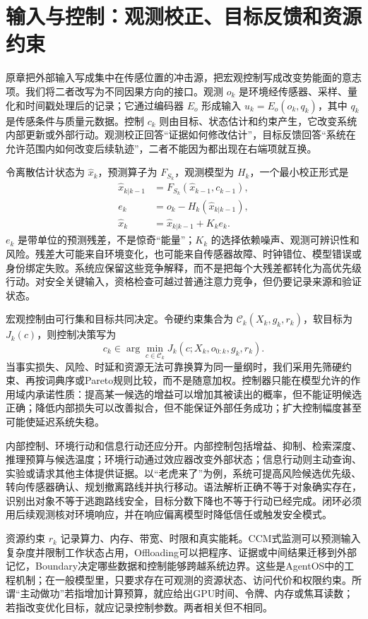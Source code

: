 \section{输入与控制：观测校正、目标反馈和资源约束}
\label{sec:section_9016}

原章把外部输入写成集中在传感位置的冲击源，把宏观控制写成改变势能面的意志项。我们将二者改写为不同因果方向的接口。观测 $o_k$ 是环境经传感器、采样、量化和时间戳处理后的记录；它通过编码器 $E_o$ 形成输入 $u_k=E_o(o_k,q_k)$，其中 $q_k$ 是传感条件与质量元数据。控制 $c_k$ 则由目标、状态估计和约束产生，它改变系统内部更新或外部行动。观测校正回答“证据如何修改估计”，目标反馈回答“系统在允许范围内如何改变后续轨迹”，二者不能因为都出现在右端项就互换。

令离散估计状态为 $\hat x_k$，预测算子为 $F_{S_k}$，观测模型为 $H_k$，一个最小校正形式是
\begin{align}
 \hat x_{k|k-1}&=F_{S_k}(\hat x_{k-1},c_{k-1}),\\
 e_k&=o_k-H_k(\hat x_{k|k-1}),\\
 \hat x_k&=\hat x_{k|k-1}+K_k e_k.
\end{align}
$e_k$ 是带单位的预测残差，不是惊奇“能量”；$K_k$ 的选择依赖噪声、观测可辨识性和风险。残差大可能来自环境变化，也可能来自传感器故障、时钟错位、模型错误或身份绑定失败。系统应保留这些竞争解释，而不是把每个大残差都转化为高优先级行动。对安全关键输入，资格检查可越过普通注意力竞争，但仍要记录来源和验证状态。

宏观控制由可行集和目标共同决定。令硬约束集合为 $\mathcal C_k(X_k,g_k,r_k)$，软目标为 $J_k(c)$，则控制决策写为
\begin{equation}
 c_k\in\arg\min_{c\in\mathcal C_k}J_k(c;X_k,o_{0:k},g_k,r_k).
\end{equation}
当事实损失、风险、时延和资源无法可靠换算为同一量纲时，我们采用先筛硬约束、再按词典序或Pareto规则比较，而不是随意加权。控制器只能在模型允许的作用域内承诺性质：提高某一候选的增益可以增加其被读出的概率，但不能证明候选正确；降低内部损失可以改善拟合，但不能保证外部任务成功；扩大控制幅度甚至可能使延迟系统失稳。

内部控制、环境行动和信息行动还应分开。内部控制包括增益、抑制、检索深度、推理预算与候选温度；环境行动通过效应器改变外部状态；信息行动则主动查询、实验或请求其他主体提供证据。以“老虎来了”为例，系统可提高风险候选优先级、转向传感器确认、规划撤离路线并执行移动。语法解析正确不等于对象确实存在，识别出对象不等于逃跑路线安全，目标分数下降也不等于行动已经完成。闭环必须用后续观测核对环境响应，并在响应偏离模型时降低信任或触发安全模式。

资源约束 $r_k$ 记录算力、内存、带宽、时限和真实能耗。CCM式监测可以预测输入复杂度并限制工作状态占用，Offloading可以把程序、证据或中间结果迁移到外部记忆，Boundary决定哪些数据和控制能够跨越系统边界。这些是AgentOS中的工程机制；在一般模型里，只要求存在可观测的资源状态、访问代价和权限约束。所谓“主动做功”若指增加计算预算，就应给出GPU时间、令牌、内存或焦耳读数；若指改变优化目标，就应记录控制参数。两者相关但不相同。

